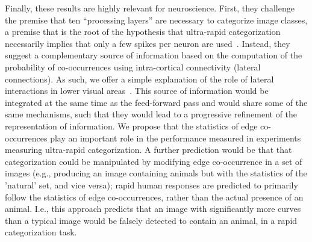 \documentclass[a4paper]{article}
\begin{document}
Finally, these results are highly relevant for neuroscience.
First, they challenge the premise that ten ``processing layers'' 
are necessary to categorize image classes, 
a premise that is the root of the hypothesis that ultra-rapid categorization 
necessarily implies that only a few spikes per neuron are used~\autocite{Thorpe01}. 
Instead, they suggest a complementary source of information based on the computation of 
the probability of co-occurrences using intra-cortical connectivity (lateral connections). 
As such, we offer a simple explanation of the role of lateral interactions 
in lower visual areas~\autocite{Bosking97,Hunt11}. 
This source of information would be integrated at the same time 
as the feed-forward pass and would share some of the same mechanisms, 
such that they would lead to a progressive refinement of the representation of information. 
We propose that the statistics of edge co-occurrences play an important role 
in the performance measured in experiments measuring ultra-rapid categorization. 
A further prediction would be that that categorization 
could be manipulated by modifying edge co-occurrence in a set of images 
(e.g., producing an image containing animals but with the statistics of the 'natural' set, and vice versa); 
rapid human responses are predicted to primarily follow the statistics of edge co-occurrences, 
rather than the actual presence of an animal. 
I.e., this approach predicts that an image with significantly more curves than a typical image 
would be falsely detected to contain an animal, in a rapid categorization task. 
\end{document}
